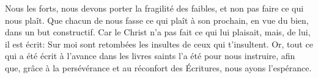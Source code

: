 Nous les forts, nous devons porter la fragilité des faibles,
	et non pas faire ce qui nous plaît.
Que chacun de nous fasse ce qui plaît à son prochain,
	en vue du bien, dans un but constructif.
Car le Christ n’a pas fait ce qui lui plaisait,
	mais, de lui, il est écrit:
	Sur moi sont retombées les insultes de ceux qui t’insultent.
Or, tout ce qui a été écrit à l'avance dans les livres saints
		l’a été pour nous instruire,
	afin que, grâce à la persévérance et au réconfort des Écritures,
	nous ayons l’espérance.

